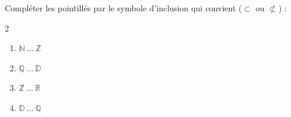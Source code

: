 \begin{exo}{}
	Compléter les pointillés par le symbole d'inclusion qui convient ($\subset$ ou $\not\subset$) :
	\begin{multicols}{2}
	\begin{enumerate}[label=\alph*), itemsep=4pt]
		\item $\mathbb{N} \ \dots \ \mathbb{Z}$
		\item $\mathbb{Q} \ \dots \ \mathbb{D}$
		\item $\mathbb{Z} \ \dots \ \mathbb{R}$
		\item $\mathbb{D} \ \dots \ \mathbb{Q}$
	\end{enumerate}
	\end{multicols}
\end{exo}
